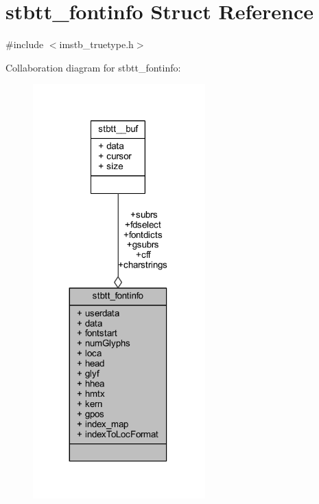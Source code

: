 \hypertarget{structstbtt__fontinfo}{}\section{stbtt\+\_\+fontinfo Struct Reference}
\label{structstbtt__fontinfo}


{\ttfamily \#include $<$imstb\+\_\+truetype.\+h$>$}



Collaboration diagram for stbtt\+\_\+fontinfo\+:
\nopagebreak
\begin{figure}[H]
\begin{center}
\leavevmode
\includegraphics[width=188pt]{structstbtt__fontinfo__coll__graph}
\end{center}
\end{figure}
